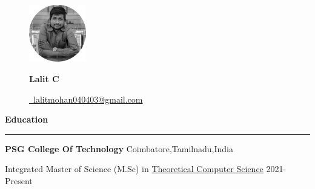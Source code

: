 \documentclass{article}
\begin{document}
\begin{figure}[h]
    \includegraphics[width=2.5cm, height=2.5cm, keepaspectratio]{resumepic.png}
    \begin{minipage}{.85\linewidth}
        \begin{center}
            \vspace*{-2cm}
            \fontsize{20}{20}
            \textbf{Lalit C}\par %
            \fontsize{12}{14}
            \faEnvelope\href{mailto:lalitmohan040403@gmail.com}{\ lalitmohan040403@gmail.com} %
            
        \end{center}
    \end{minipage}
\end{figure}\par




\hypersetup{hidelinks,colorlinks,urlcolor=black}
\vspace*{0.5cm} %
\fontsize{15}{14}
\faUniversity\textbf{\Large{Education}}\par
\rule{\linewidth}{0.5pt} %
\fontsize{10}{14}
\vspace*{0.25cm}\par\textbf{PSG College Of Technology}  \hfill\fontsize{8}{14}Coimbatore,Tamilnadu,India\par
Integrated Master of Science (M.Sc) in \href{https://s3.us-west-2.amazonaws.com/secure.notion-static.com/78fe11b0-7e18-4553-ad3d-65f6e20e70c9/Syllabus.pdf?X-Amz-Algorithm=AWS4-HMAC-SHA256&X-Amz-Content-Sha256=UNSIGNED-PAYLOAD&X-Amz-Credential=AKIAT73L2G45EIPT3X45\%2F20230204\%2Fus-west-2\%2Fs3\%2Faws4_request&X-Amz-Date=20230204T142759Z&X-Amz-Expires=86400&X-Amz-Signature=68b85a34ba3db514d415df39d9d28a840ae409ea2239c61ee33a7eb012d874a9&X-Amz-SignedHeaders=host&response-content-disposition=filename\%3D\%22Syllabus.pdf\%22&x-id=GetObject}{Theoretical Computer Science} \hfill2021-Present
\end{document}
